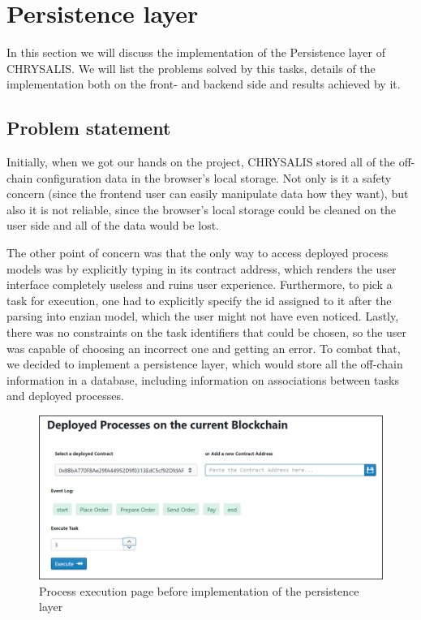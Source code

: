 %
\section{Persistence layer}
\label{sec:impr:persistence}

In this section we will discuss the implementation of the Persistence layer of CHRYSALIS. We will list the problems solved by this tasks, details of the implementation both on the front- and backend side and results achieved by it. 

\subsection{Problem statement}
\label{sec:impr:persistence:problem}

Initially, when we got our hands on the project, CHRYSALIS stored all of the off-chain configuration data in the browser's local storage. Not only is it a safety concern (since the frontend user can easily manipulate data how they want), but also it is not reliable, since the browser's local storage could be cleaned on the user side and all of the data would be lost. 

The other point of concern was that the only way to access deployed process models was by explicitly typing in its contract address, which renders the user interface completely useless and ruins user experience. Furthermore, to pick a task for execution, one had to explicitly specify the id assigned to it after the parsing into enzian model, which the user might not have even noticed. Lastly, there was no constraints on the task identifiers that could be chosen, so the user was capable of choosing an incorrect one and getting an error. To combat that, we decided to implement a persistence layer, which would store all the off-chain information in a database, including information on associations between tasks and deployed processes. 

\begin{figure}[hbt]
	\includegraphics[width=\textwidth]{gfx/persistence_before}
	\caption{Process execution page before implementation of the persistence layer}
	\label{fig:impr:persistence:before}
\end{figure}


